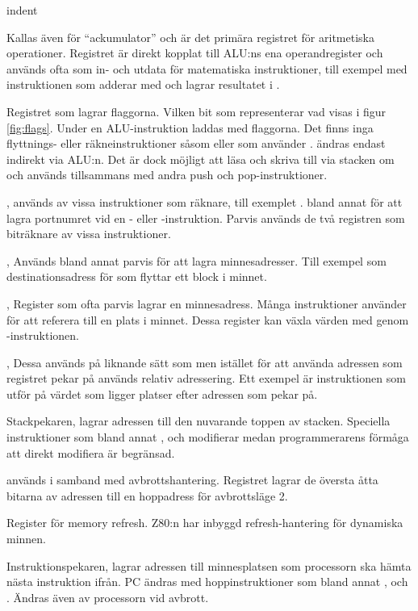 \documentclass[main.tex]{subfiles}
\begin{document}
\begin{labeling}{indent}
\item[\mono{A}]
    Kallas även för ``ackumulator'' och är det primära registret för
    aritmetiska operationer. Registret är direkt kopplat till ALU:ns ena
    operandregister och används ofta som in- och utdata för matematiska
    instruktioner, till exempel med instruktionen  som adderar
     med  och lagrar resultatet i .
\item[\mono{F}]
    Registret som lagrar flaggorna. Vilken bit som representerar vad visas i
    figur \ref{fig:flags}. Under en ALU-instruktion laddas  med
    flaggorna. Det finns inga flyttnings- eller räkneinstruktioner såsom
     eller  som använder .  ändras endast
    indirekt via ALU:n. Det är dock möjligt att läsa och skriva till 
    via stacken om  och  används tillsammans med
    andra push och pop-instruktioner.
\item[\mono{B}, \mono{C}]
     används av vissa instruktioner som räknare, till exemplet
    .  bland annat för att lagra portnumret vid en
    - eller -instruktion. Parvis används de två registren som
    biträknare av vissa instruktioner.
\item[\mono{D}, \mono{E}]
    Används bland annat parvis för att lagra minnesadresser. Till exempel som
    destinationsadress för  som flyttar ett block i minnet.
\item[\mono{H}, \mono{L}]
    Register som ofta parvis lagrar en minnesadress. Många instruktioner
    använder  för att referera till en plats i minnet. Dessa register
    kan växla värden med  genom -instruktionen.
\item[\mono{IX}, \mono{IY}]
    Dessa används på liknande sätt som  men istället för att använda
    adressen som registret pekar på används relativ adressering. Ett exempel är
    instruktionen  som utför  på värdet som ligger
     platser efter adressen som  pekar på.
\item[\mono{SP}]
    Stackpekaren, lagrar adressen till den nuvarande toppen av stacken.
    Speciella instruktioner som bland annat ,  och
     modifierar  medan programmerarens förmåga att direkt
    modifiera  är begränsad.
\item[\mono{I}]
     används i samband med avbrottshantering. Registret lagrar de
    översta åtta bitarna av adressen till en hoppadress för avbrottsläge 2.
\item[\mono{R}]
    Register för memory refresh. Z80:n har inbyggd refresh-hantering för
    dynamiska minnen.
\item[\mono{PC}]
    Instruktionspekaren, lagrar adressen till minnesplatsen som processorn ska
    hämta nästa instruktion ifrån. PC ändras med hoppinstruktioner som bland
    annat ,  och . Ändras även av processorn vid
    avbrott.
\end{labeling}
\end{document}
